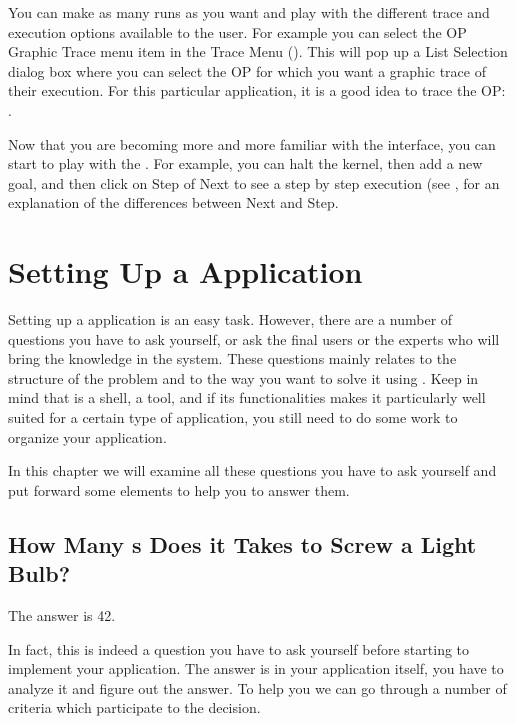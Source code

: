 You can make as many runs as you want and play with the different trace
and execution options available to the user. For example you can select
the OP Graphic Trace menu item in the Trace Menu (). This will pop up a List Selection dialog box where you can
select the OP for which you want a graphic trace of their execution. For
this particular application, it is a good idea to trace the OP:
.

Now that you are becoming more and more familiar with the interface, you
can start to play with the . For example,
you can halt the kernel, then add a new goal, and then click on Step of
Next to see a step by step execution (see , for an explanation of the differences between Next and Step.

\chapter{Setting Up a \COPRS{} Application}

Setting up a \COPRS{} application is an easy task. However, there are a number
of questions you have to ask yourself, or ask the final users or the experts
who will bring the knowledge in the system. These questions mainly relates to
the structure of the problem and to the way you want to solve it using \COPRS{}.
Keep in mind that \COPRS{} is a shell, a tool, and if its functionalities makes
it particularly well suited for a certain type of application, you still need
to do some work to organize your application.

In this chapter we will examine all these questions you have to ask
yourself and put forward some elements to help you to answer them.



\section{How Many \CPK{}s Does it Takes to Screw a Light Bulb?}

The answer is 42.

In fact, this is indeed a question you have to ask yourself before
starting to implement your \COPRS{} application. The answer is in your
application itself, you have to analyze it and figure out the answer. To
help you we can go through a number of criteria which participate to the
decision.

